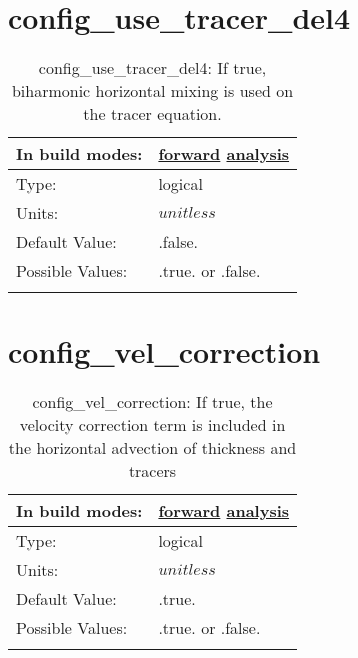 \section[config\_use\_tracer\_del4]{config\_use\_tracer\_del4}
\label{sec:nm_sec_config_use_tracer_del4}
\begin{center}
\begin{longtable}{| p{2.0in} || p{4.0in} |}
    \hline
    In build modes: & \hyperref[subsec:forward_nm_tab_hmix_del4]{forward} \hyperref[subsec:analysis_nm_tab_hmix_del4]{analysis} \\
    \hline
    Type: & logical \\
    \hline
    Units: & $unitless$ \\
    \hline
    Default Value: & .false. \\
    \hline
    Possible Values: & .true. or .false. \\
    \hline
    \caption{config\_use\_tracer\_del4: If true, biharmonic horizontal mixing is used on the tracer equation.}
\end{longtable}
\end{center}
\section[config\_vel\_correction]{config\_vel\_correction}
\label{sec:nm_sec_config_vel_correction}
\begin{center}
\begin{longtable}{| p{2.0in} || p{4.0in} |}
    \hline
    In build modes: & \hyperref[subsec:forward_nm_tab_split_explicit_ts]{forward} \hyperref[subsec:analysis_nm_tab_split_explicit_ts]{analysis} \\
    \hline
    Type: & logical \\
    \hline
    Units: & $unitless$ \\
    \hline
    Default Value: & .true. \\
    \hline
    Possible Values: & .true. or .false. \\
    \hline
    \caption{config\_vel\_correction: If true, the velocity correction term is included in the horizontal advection of thickness and tracers}
\end{longtable}
\end{center}

